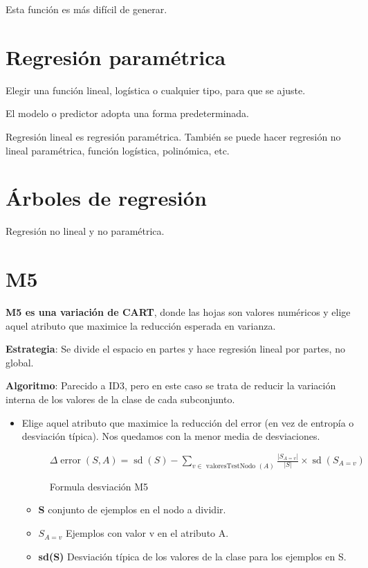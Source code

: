 \documentclass[12pt, twoside, openright]{report} %
\begin{document}
Esta función es más difícil de generar.

\section{Regresión paramétrica}

Elegir una función lineal, logística o cualquier tipo, para que se ajuste.

El modelo o predictor adopta una forma predeterminada.

Regresión lineal es regresión paramétrica. También se puede hacer
regresión no lineal paramétrica, función logística, polinómica, etc.

\section{Árboles de regresión}

Regresión no lineal y no paramétrica.

\section{M5}

\textbf{M5 es una variación de CART}, donde las hojas son valores numéricos y
elige aquel atributo que maximice la reducción esperada en varianza.

\textbf{Estrategia}: Se divide el espacio en partes y hace regresión
lineal por partes, no global.

\textbf{Algoritmo}: Parecido a ID3, pero en este caso se trata de
reducir la variación interna de los valores de la clase de cada
subconjunto.

\begin{itemize}
\item
  Elige aquel atributo que maximice la reducción del error (en vez de
  entropía o desviación típica). Nos quedamos con la menor media de
  desviaciones.
  \begin{figure}[H]
    \(\Delta \operatorname{error}(S, A)=\operatorname{sd}(S)-\sum_{v \in \text { valoresTestNodo }(A)} \frac{\left|S_{A=v}\right|}{|S|} \times \operatorname{sd}\left(S_{A=v}\right)\)
    \captionsetup{justification=centering}
    \caption{Formula desviación M5}
  \end{figure}

  \begin{itemize}
  
  \item
    \textbf{S} conjunto de ejemplos en el nodo a dividir.
  \item
    \textbf{\(S_{A=v}\)} Ejemplos con valor v en el atributo A.
  \item
    \textbf{sd(S)} Desviación típica de los valores de la clase para los
    ejemplos en S.
  \end{itemize}
\end{itemize}
\end{document}

